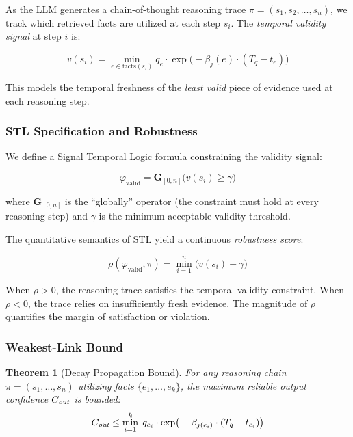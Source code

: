 \documentclass[conference]{IEEEtran}
\newtheorem{theorem}{Theorem}
\begin{document}
As the LLM generates a chain-of-thought reasoning trace $\pi = (s_1, s_2, \ldots, s_n)$, we track which retrieved facts are utilized at each step $s_i$. The \emph{temporal validity signal} at step $i$ is:

\begin{equation}
    v(s_i) = \min_{e \in \text{facts}(s_i)} q_e \cdot \exp\!\big(-\beta_j(e) \cdot (T_q - t_e)\big)
    \label{eq:validity_signal}
\end{equation}

\noindent This models the temporal freshness of the \emph{least valid} piece of evidence used at each reasoning step.

\subsubsection{STL Specification and Robustness}

We define a Signal Temporal Logic formula constraining the validity signal:

\begin{equation}
    \varphi_{\text{valid}} = \mathbf{G}_{[0,n]}\big(v(s_i) \geq \gamma\big)
    \label{eq:stl}
\end{equation}

\noindent where $\mathbf{G}_{[0,n]}$ is the ``globally'' operator (the constraint must hold at every reasoning step) and $\gamma$ is the minimum acceptable validity threshold.

The quantitative semantics of STL yield a continuous \emph{robustness score}:

\begin{equation}
    \rho(\varphi_{\text{valid}}, \pi) = \min_{i=1}^{n} \big(v(s_i) - \gamma\big)
    \label{eq:robustness}
\end{equation}

When $\rho > 0$, the reasoning trace satisfies the temporal validity constraint. When $\rho < 0$, the trace relies on insufficiently fresh evidence. The magnitude of $\rho$ quantifies the margin of satisfaction or violation.

\subsubsection{Weakest-Link Bound}

\begin{theorem}[Decay Propagation Bound]
\label{thm:weakest}
For any reasoning chain $\pi = (s_1, \ldots, s_n)$ utilizing facts $\{e_1, \ldots, e_k\}$, the maximum reliable output confidence $C_{\emph{out}}$ is bounded:
\begin{equation}
    C_{\emph{out}} \leq \min_{i=1}^{k}\; q_{e_i} \cdot \exp\!\big(-\beta_{j(e_i)} \cdot (T_q - t_{e_i})\big)
    \label{eq:weakest_link}
\end{equation}
\end{theorem}
\end{document}
